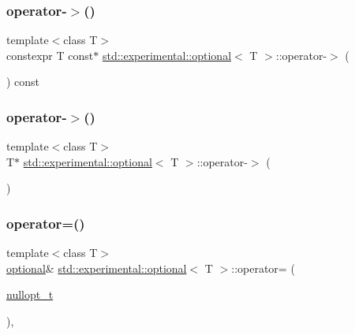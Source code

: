 \subsubsection{\texorpdfstring{operator-\/$>$()}{operator->()}\hspace{0.1cm}{\footnotesize\ttfamily [1/2]}}
{\footnotesize\ttfamily template$<$class T$>$ \\
constexpr T const$\ast$ \hyperlink{classstd_1_1experimental_1_1optional}{std\+::experimental\+::optional}$<$ T $>$\+::operator-\/$>$ (\begin{DoxyParamCaption}{ }\end{DoxyParamCaption}) const\hspace{0.3cm}{\ttfamily [inline]}}

\mbox{\label{classstd_1_1experimental_1_1optional_ae600987ec09d6e04e894ddbe5f0a0b3f}} 
\subsubsection{\texorpdfstring{operator-\/$>$()}{operator->()}\hspace{0.1cm}{\footnotesize\ttfamily [2/2]}}
{\footnotesize\ttfamily template$<$class T$>$ \\
T$\ast$ \hyperlink{classstd_1_1experimental_1_1optional}{std\+::experimental\+::optional}$<$ T $>$\+::operator-\/$>$ (\begin{DoxyParamCaption}{ }\end{DoxyParamCaption})\hspace{0.3cm}{\ttfamily [inline]}}

\mbox{\label{classstd_1_1experimental_1_1optional_a18ebe94413663ea3b18d9e8d98fbc9af}} 
\subsubsection{\texorpdfstring{operator=()}{operator=()}\hspace{0.1cm}{\footnotesize\ttfamily [1/4]}}
{\footnotesize\ttfamily template$<$class T$>$ \\
\hyperlink{classstd_1_1experimental_1_1optional}{optional}\& \hyperlink{classstd_1_1experimental_1_1optional}{std\+::experimental\+::optional}$<$ T $>$\+::operator= (\begin{DoxyParamCaption}\item[{\hyperlink{structstd_1_1experimental_1_1nullopt__t}{nullopt\+\_\+t}}]{ }\end{DoxyParamCaption})\hspace{0.3cm}{\ttfamily [inline]}, {\ttfamily [noexcept]}}

